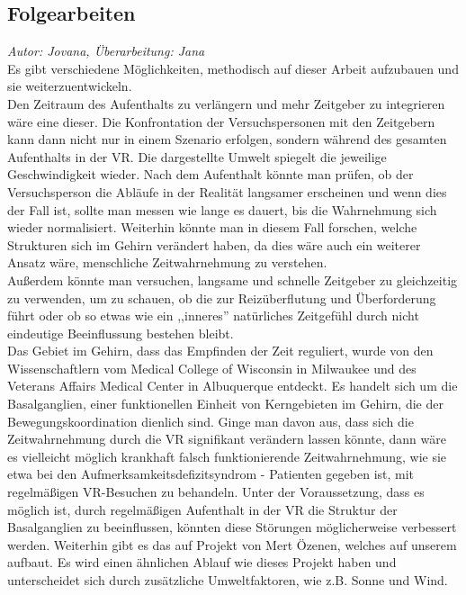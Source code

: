 \documentclass{Bericht}
\begin{document}
\subsection{Folgearbeiten}
\textit{Autor: Jovana, Überarbeitung: Jana}\\
Es gibt verschiedene Möglichkeiten, methodisch auf dieser Arbeit aufzubauen und sie weiterzuentwickeln.\\ Den Zeitraum des Aufenthalts zu verlängern und mehr Zeitgeber zu integrieren wäre eine dieser. Die Konfrontation der Versuchspersonen mit den Zeitgebern kann dann nicht nur in einem Szenario erfolgen, sondern während des gesamten Aufenthalts in der VR. Die dargestellte Umwelt spiegelt die jeweilige Geschwindigkeit wieder. Nach dem Aufenthalt könnte man prüfen, ob der Versuchsperson die Abläufe in der Realität langsamer erscheinen und wenn dies der Fall ist, sollte man messen wie lange es dauert, bis die Wahrnehmung sich wieder normalisiert. Weiterhin könnte man in diesem Fall forschen, welche Strukturen sich im Gehirn verändert haben, da dies wäre auch ein weiterer Ansatz wäre, menschliche Zeitwahrnehmung zu verstehen.\\
Außerdem könnte man versuchen, langsame und schnelle Zeitgeber zu gleichzeitig zu verwenden, um zu schauen, ob die zur Reizüberflutung und Überforderung führt oder ob so etwas wie ein ,,inneres'' natürliches Zeitgefühl durch nicht eindeutige Beeinflussung bestehen bleibt.\\
Das Gebiet im Gehirn, dass das Empfinden der Zeit reguliert, wurde von den Wissenschaftlern vom Medical College of Wisconsin in Milwaukee und des Veterans Affairs Medical Center in Albuquerque entdeckt. Es handelt sich um die Basalganglien, einer funktionellen Einheit von Kerngebieten im Gehirn, die der Bewegungskoordination dienlich sind. Ginge man davon aus, dass sich die Zeitwahrnehmung durch die VR signifikant verändern lassen könnte, dann wäre es vielleicht möglich krankhaft falsch funktionierende Zeitwahrnehmung, wie sie etwa bei den Aufmerksamkeitsdefizitsyndrom - Patienten gegeben ist, mit regelmäßigen VR-Besuchen zu behandeln. Unter der Voraussetzung, dass es  möglich ist, durch regelmäßigen Aufenthalt in der VR die Struktur der Basalganglien zu beeinflussen, könnten diese Störungen möglicherweise verbessert werden.\cite{gehirn}
Weiterhin gibt es das auf Projekt von Mert Özenen, welches auf unserem aufbaut. Es wird einen ähnlichen Ablauf wie dieses Projekt haben und unterscheidet sich durch zusätzliche Umweltfaktoren, wie z.B. Sonne und Wind.
\end{document}
